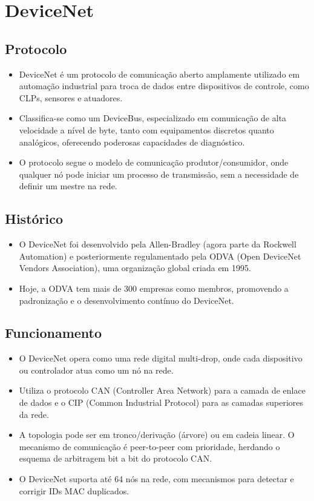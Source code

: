 \documentclass[a4paper,11pt]{article} %
\begin{document}
\section{DeviceNet}

\subsection{Protocolo}
\begin{itemize}
    \item DeviceNet é um protocolo de comunicação aberto amplamente utilizado em automação industrial para troca de dados entre dispositivos de controle, como CLPs, sensores e atuadores.
    \item Classifica-se como um DeviceBus, especializado em comunicação de alta velocidade a nível de byte, tanto com equipamentos discretos quanto analógicos, oferecendo poderosas capacidades de diagnóstico.
    \item O protocolo segue o modelo de comunicação produtor/consumidor, onde qualquer nó pode iniciar um processo de transmissão, sem a necessidade de definir um mestre na rede.
\end{itemize}

\subsection{Histórico}
\begin{itemize}
    \item O DeviceNet foi desenvolvido pela Allen-Bradley (agora parte da Rockwell Automation) e posteriormente regulamentado pela ODVA (Open DeviceNet Vendors Association), uma organização global criada em 1995.
    \item Hoje, a ODVA tem mais de 300 empresas como membros, promovendo a padronização e o desenvolvimento contínuo do DeviceNet.
\end{itemize}

\subsection{Funcionamento}
\begin{itemize}
    \item O DeviceNet opera como uma rede digital multi-drop, onde cada dispositivo ou controlador atua como um nó na rede.
    \item Utiliza o protocolo CAN (Controller Area Network) para a camada de enlace de dados e o CIP (Common Industrial Protocol) para as camadas superiores da rede.
    \item A topologia pode ser em tronco/derivação (árvore) ou em cadeia linear. O mecanismo de comunicação é peer-to-peer com prioridade, herdando o esquema de arbitragem bit a bit do protocolo CAN.
    \item O DeviceNet suporta até 64 nós na rede, com mecanismos para detectar e corrigir IDs MAC duplicados.
\end{itemize}
\end{document}
